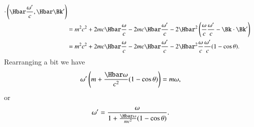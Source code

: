 {\begin{equation}
\begin{aligned}
\cdot \left(\Hbar \frac{\omega'}{c}, \Hbar \Bk' \right) \\
&=
m^2 c^2 + 2 m c \Hbar \frac{\omega}{c} - 2 m c \Hbar \frac{\omega'}{c}
- 2\Hbar^2 \left(
\frac{\omega}{c} \frac{\omega'}{c}
-
\Bk \cdot \Bk'
\right) \\
&=
m^2 c^2 + 2 m c \Hbar \frac{\omega}{c} - 2 m c \Hbar \frac{\omega'}{c}
- 2\Hbar^2
\frac{\omega}{c} \frac{\omega'}{c} (1 - \cos\theta).
\end{aligned}
\end{equation}
%
Rearranging a bit we have
%
\begin{equation}\label{eqn:relativisticElectrodynamicsExamReflection:430}
\omega' \left( m + \frac{\Hbar \omega}{c^2} ( 1 - \cos\theta ) \right) = m \omega,
\end{equation}
or
\begin{equation}\label{eqn:relativisticElectrodynamicsExamReflection:450}
\omega' = \frac{\omega}{
1 + \frac{\Hbar \omega}{m c^2} ( 1 - \cos\theta )
}.
\end{equation}
} %
